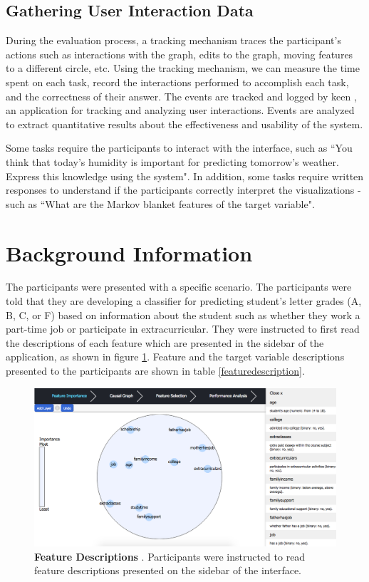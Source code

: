 \subsection { Gathering User Interaction Data }
During the evaluation process, a tracking mechanism traces the participant's actions such as interactions with the graph, edits to the graph, moving features to a different circle, etc. Using the tracking mechanism, we can measure the time spent on each task, record the interactions performed to accomplish each task, and the correctness of their answer. The events are tracked and logged by keen \cite{keen}, an application for tracking and analyzing user interactions. Events are analyzed to extract quantitative results about the effectiveness and usability of the system.

Some tasks require the participants to interact with the interface, such as ``You think that today's humidity is important for predicting tomorrow's weather. Express this knowledge using the system". In addition, some tasks require written responses to understand if the participants correctly interpret the visualizations - such as ``What are the Markov blanket features of the target variable".

\section { Background Information }
The participants were presented with a specific scenario. The participants were told that they are developing a classifier for predicting student's letter grades (A, B, C, or F) based on information about the student such as whether they work a part-time job or participate in extracurricular. They were instructed to first read the descriptions of each feature which are presented in the sidebar of the application, as shown in figure \ref{fig:featuredescriptions}. Feature and the target variable descriptions presented to the participants are shown in table \ref{featuredescription}.

\begin{figure}
    \centering
    \includegraphics[width=.8\textwidth]{featuredescriptions}
    \caption{\textbf{ Feature Descriptions }. Participants were instructed to read feature descriptions presented on the sidebar of the interface. }
    \label{fig:featuredescriptions}
\end{figure}


